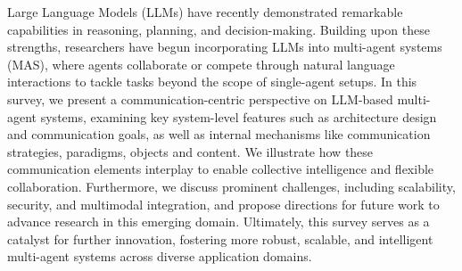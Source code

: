 Large Language Models (LLMs) have recently demonstrated remarkable capabilities in reasoning, planning, and decision-making. Building upon these strengths, researchers have begun incorporating LLMs into multi-agent systems (MAS), where agents collaborate or compete through natural language interactions to tackle tasks beyond the scope of single-agent setups. In this survey, we present a communication-centric perspective on LLM-based multi-agent systems, examining key system-level features such as architecture design and communication goals, as well as internal mechanisms like communication strategies, paradigms, objects and content. We illustrate how these communication elements interplay to enable collective intelligence and flexible collaboration. Furthermore, we discuss prominent challenges, including scalability, security, and multimodal integration, and propose directions for future work to advance research in this emerging domain.  Ultimately, this survey serves as a catalyst for further innovation, fostering more robust, scalable, and intelligent multi-agent systems across diverse application domains.